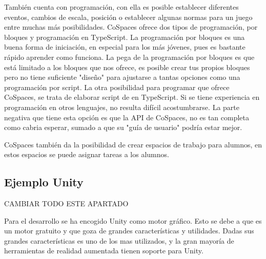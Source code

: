 También cuenta con programación, con ella es posible establecer diferentes eventos, cambios de escala, posición o establecer algunas normas para un juego entre muchas más posibilidades. CoSpaces ofrece dos tipos de programación, por bloques y programación en TypeScript. La programación por bloques es una buena forma de iniciación, en especial para los más jóvenes, pues es bastante rápido aprender como funciona. La pega de la programación por bloques es que está limitado a los bloques que nos ofrece, es posible crear tus propios bloques pero no tiene suficiente "diseño" para ajustarse a tantas opciones como una programación por script. 
La otra posibilidad para programar que ofrece CoSpaces, se trata de elaborar script de en TypeScript. Si se tiene experiencia en programación en otros lenguajes, no resulta difícil acostumbrarse. La parte negativa que tiene esta opción es que la API de CoSpaces, no es tan completa como cabria esperar, sumado a que su "guía de usuario" podría estar mejor.


CoSpaces también da la posibilidad de crear espacios de trabajo para alumnos, en estos espacios se puede asignar tareas a los alumnos.


\subsection{Ejemplo Unity}
CAMBIAR TODO ESTE APARTADO

Para el desarrollo se ha encogido Unity como motor gráfico. Esto se debe a que es un motor gratuito y que goza de grandes características y utilidades. Dadas sus grandes características es uno de los mas utilizados, y la gran mayoría de herramientas de realidad aumentada tienen soporte para Unity.



